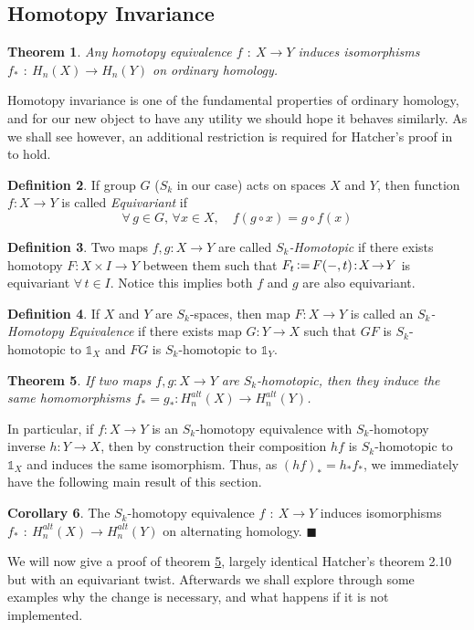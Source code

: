 \documentclass[11pt,a4paper,twoside]{article}
\theoremstyle{plain}
\newtheorem{thm}{Theorem}[subsection]
\theoremstyle{definition}
\newtheorem{defn}[thm]{Definition}
\theoremstyle{definition}
\theoremstyle{definition}
\newtheorem{corollary}[thm]{Corollary}
\theoremstyle{definition}
\theoremstyle{definition}
\DeclareMathOperator{\co}{\!\colon\!}
\DeclareMathOperator{\coloneqq}{\vcentcolon=}
\begin{document}
\subsection{Homotopy Invariance}
\label{Sec_HomotopyInvariance}
\begin{thm}
Any homotopy equivalence $f\co X\rightarrow Y$ induces isomorphisms $f_*\co H_n(X)\rightarrow H_n(Y)$ on ordinary homology.
\end{thm}
Homotopy invariance is one of the fundamental properties of ordinary homology, and for our new object to have any utility we should hope it behaves similarly. As we shall see however, an additional restriction is required for Hatcher's proof in \cite{algebraictopology} to hold. 

\begin{defn}
If group $G$ ($S_k$ in our case) acts on spaces $X$ and $Y$, then function $f\!:\!X\rightarrow Y$ is called \emph{Equivariant} if 
$$\forall\,g\in G,\,\forall x\in X,\quad f(g\circ x)=g\circ f(x)$$
\end{defn}
\begin{defn}
Two maps $f,g\!:\!X\!\rightarrow\!Y$ are called \emph{$S_k$-Homotopic} if there exists homotopy $F\!:\!X\!\times\! I\!\rightarrow\!Y$ between them such that $F_t\coloneqq F(-,t)\!:\!X\!\rightarrow\!Y$ is equivariant $\forall\,t\in I$. Notice this implies both $f$ and $g$ are also equivariant.
\end{defn}
\begin{defn}
If $X$ and $Y$ are $S_k$-spaces, then map $F\!:X\!\longrightarrow\!Y$ is called an \emph{$S_k$-Homotopy Equivalence} if there exists map $G\!:\!Y\!\longrightarrow\!X$ such that $GF$ is $S_k$-homotopic to $\mathbb{1}_X$ and $FG$ is $S_k$-homotopic to $\mathbb{1}_Y$.
\end{defn}

\begin{thm}\label{EquivariantHomotopyHomomorphism}
If two maps $f,g\!:\!X\rightarrow Y$ are $S_k$-homotopic, then they induce the same homomorphisms $f_*\!=\!g_*\!:\!H_n^{alt}(X)\rightarrow H_n^{alt}(Y)$.
\end{thm}
In particular, if $f\!:\!X\longrightarrow Y$ is an $S_k$-homotopy equivalence with $S_k$-homotopy inverse $h\!:\!Y\longrightarrow X$, then by construction their composition $hf$ is $S_k$-homotopic to $\mathbb{1}_X$ and induces the same isomorphism. Thus, as $(hf)_*=h_*f_*$, we immediately have the following main result of this section.

\vspace{2mm}
\begin{corollary}\label{Cor:SkHomotopyEquivalence}
The $S_k$-homotopy equivalence $f\co X\rightarrow Y$ induces isomorphisms $f_*\co H_n^{alt}(X)\rightarrow H_n^{alt}(Y)$ on alternating homology. \hfill $\blacksquare$
\end{corollary}
We will now give a proof of theorem \ref{EquivariantHomotopyHomomorphism}, largely identical Hatcher's theorem 2.10 but with an equivariant twist. Afterwards we shall explore through some examples why the change is necessary, and what happens if it is not implemented.
\end{document}

